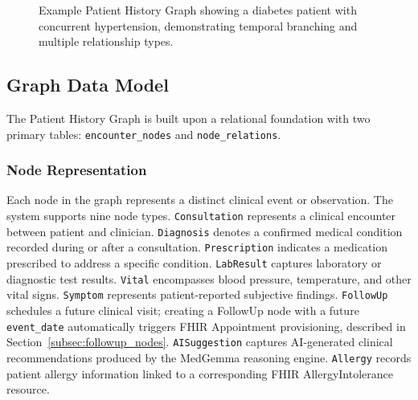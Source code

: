 \begin{figure}[H]
{\begin{minipage}{\dimexpr\textwidth-2\fboxsep-2\fboxrule\relax}
        \end{minipage}}
    \caption{Example Patient History Graph showing a diabetes patient with concurrent hypertension, demonstrating temporal branching and multiple relationship types.}
    \label{fig:patient_history_graph_example}
\end{figure}

\subsection{Graph Data Model}
\label{subsec:graph_model}

The Patient History Graph is built upon a relational foundation with two
primary tables: \texttt{encounter\_nodes} and \texttt{node\_relations}.

\subsubsection{Node Representation}
Each node in the graph represents a distinct clinical event or observation. The
system supports nine node types. \texttt{Consultation} represents a clinical
encounter between patient and clinician. \texttt{Diagnosis} denotes a confirmed
medical condition recorded during or after a consultation. \texttt{Prescription}
indicates a medication prescribed to address a specific condition.
\texttt{LabResult} captures laboratory or diagnostic test results. \texttt{Vital}
encompasses blood pressure, temperature, and other vital signs. \texttt{Symptom}
represents patient-reported subjective findings. \texttt{FollowUp} schedules a
future clinical visit; creating a FollowUp node with a future \texttt{event\_date}
automatically triggers FHIR Appointment provisioning, described in
Section~\ref{subsec:followup_nodes}. \texttt{AISuggestion} captures
AI-generated clinical recommendations produced by the MedGemma reasoning engine.
\texttt{Allergy} records patient allergy information linked to a corresponding
FHIR AllergyIntolerance resource.

